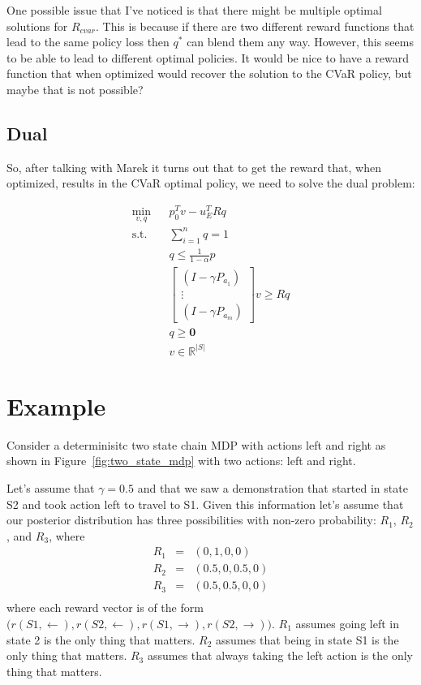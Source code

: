 \documentclass{article}
\newcommand{\zero}{\mathbf{0}}
\begin{document}
One possible issue that I've noticed is that there might be multiple optimal solutions for $R_{cvar}$. This is because if there are two different reward functions that lead to the same policy loss then $q^*$ can blend them any way. However, this seems to be able to lead to different optimal policies. It would be nice to have a reward function that when optimized would recover the solution to the CVaR policy, but maybe that is not possible?

\subsection{Dual}

So, after talking with Marek it turns out that to get the reward that, when optimized, results in the CVaR optimal policy, we need to solve the dual problem:

\begin{eqnarray}
\min_{v, q}&& p_0^T v - u_E^T R q\\
\text{s.t.}&& \sum_{i=1}^n q = 1 \\
&& q \leq \frac{1}{1-\alpha}p\\
&&\begin{bmatrix}
(I - \gamma P_{a_1})\\
\vdots \\
(I - \gamma P_{a_m})
\end{bmatrix}
v \geq Rq\\
&& q \geq \zero \\
&& v \in \mathbb{R}^{|S|}
\end{eqnarray}	

\section{Example}

Consider a determinisitc two state chain MDP with actions left and right as shown in Figure~\ref{fig:two_state_mdp} with two actions: left and right.

Let's assume that $\gamma = 0.5$ and that we saw a demonstration that started in state S2 and took action left to travel to S1. Given this information let's assume that our posterior distribution has three possibilities with non-zero probability: $R_1$, $R_2$, and $R_3$, where
\begin{eqnarray}
  R_1 &=& (0, 1, 0, 0) \\
  R_2 &=& (0.5, 0, 0.5, 0)  \\ 
  R_3 &=& (0.5, 0.5, 0, 0) \\
\end{eqnarray}
where each reward vector is of the form $\big(r(S1, \leftarrow), r(S2,\leftarrow), r(S1, \rightarrow), r(S2, \rightarrow)\big)$. $R_1$ assumes going left in state 2 is the only thing that matters. $R_2$ assumes that being in state S1 is the only thing that matters. $R_3$ assumes that always taking the left action is the only thing that matters.
\end{document}
